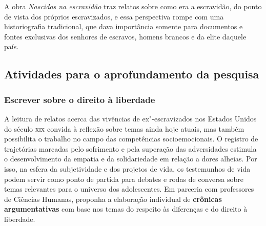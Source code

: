 \documentclass[11pt]{extarticle}
\begin{document}
A obra \emph{Nascidos na escravidão} traz relatos sobre como era a
escravidão, do ponto de vista dos próprios escravizados, e essa
perspectiva rompe com uma historiografia tradicional, que dava
importância somente para documentos e fontes exclusivas dos senhores de
escravos, homens brancos e da elite daquele país.


\subsection{Atividades para o aprofundamento da pesquisa}



\subsubsection{Escrever sobre o direito à liberdade}

  A leitura de relatos acerca das vivências de ex"-escravizados nos
  Estados Unidos do século \textsc{xix} convida à reflexão sobre temas ainda hoje
  atuais, mas também possibilita o trabalho no campo das competências
  socioemocionais. O registro de trajetórias marcadas pelo sofrimento e
  pela superação das adversidades estimula o desenvolvimento da empatia
  e da solidariedade em relação a dores alheias. Por isso, na esfera da
  subjetividade e dos projetos de vida, os testemunhos de vida podem
  servir como ponto de partida para debates e rodas de conversa sobre
  temas relevantes para o universo dos adolescentes. Em parceria com
  professores de Ciências Humanas, proponha a elaboração individual de
  \textbf{crônicas argumentativas} com base nos temas do respeito às
  diferenças e do direito à liberdade. 
\end{document}
